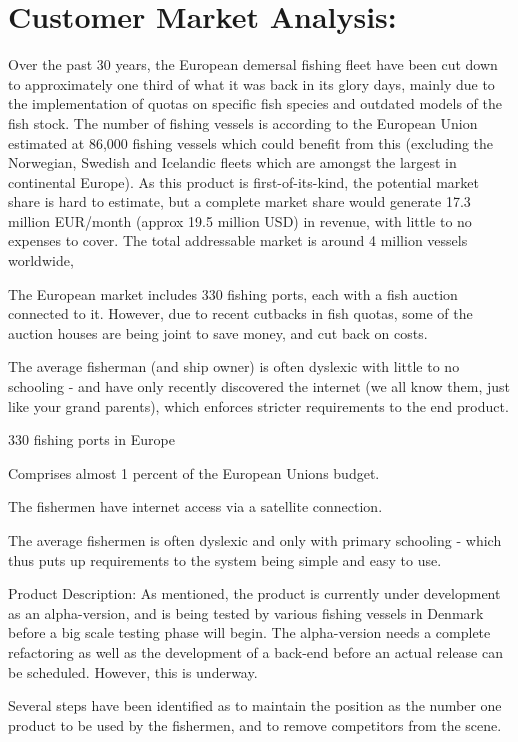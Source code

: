 \documentclass[12pt]{article}
\begin{document}
\section{Customer Market Analysis:}
Over the past 30 years, the European demersal fishing fleet have been cut down to approximately one third of what it was back in its glory days, mainly due to the implementation of quotas on specific fish species and outdated models of the fish stock. The number of fishing vessels is according to the European Union estimated at 86,000 fishing vessels which could benefit from this (excluding the Norwegian, Swedish and Icelandic fleets which are amongst the largest in continental Europe). As this product is first-of-its-kind, the potential market share is hard to estimate, but a complete market share would generate 17.3 million EUR/month (approx 19.5 million USD) in revenue, with little to no expenses to cover. The total addressable market is around 4 million vessels worldwide, 

The European market includes 330 fishing ports, each with a fish auction connected to it. However, due to recent cutbacks in fish quotas, some of the auction houses are being joint to save money, and cut back on costs. 

The average fisherman (and ship owner) is often dyslexic with little to no schooling - and have only recently discovered the internet (we all know them, just like your grand parents), which enforces stricter requirements to the end product. 


330 fishing ports in Europe

Comprises almost 1 percent of the European Unions budget.

The fishermen have internet access via a satellite connection.

The average fishermen is often dyslexic and only with primary schooling - which thus puts up requirements to the system being simple and easy to use. 

Product Description:
As mentioned, the product is currently under development as an alpha-version, and is being tested by various fishing vessels in Denmark before a big scale testing phase will begin. The alpha-version needs a complete refactoring as well as the development of a back-end before an actual release can be scheduled. However, this is underway. 

Several steps have been identified as to maintain the position as the number one product to be used by the fishermen, and to remove competitors from the scene. 
\end{document}
